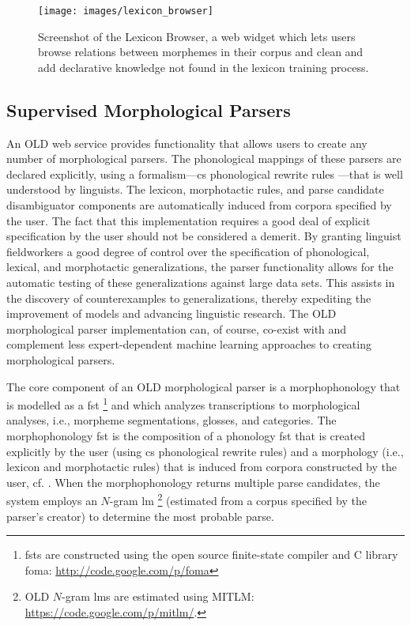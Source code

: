 \documentclass[11pt]{article}
\begin{document}
\begin{figure}
\begin{center}
\texttt{[image: images/lexicon\_browser]}
\caption{Screenshot of the Lexicon Browser, a web widget which lets users browse relations between morphemes in their corpus and clean and add declarative knowledge not found in the lexicon training process.}
\label{lexicon_browser_screenshot}
\end{center}
\end{figure}


\subsection{Supervised Morphological Parsers}

An OLD web service provides functionality that allows users to create any
number of morphological parsers. The phonological mappings of these parsers
are declared explicitly, using a formalism---\gls{cs} phonological rewrite
rules \cite{chomsky68}---that is well understood by linguists. The lexicon,
morphotactic rules, and parse candidate disambiguator components are
automatically induced from corpora specified by the user. The fact that this
implementation requires a good deal of explicit specification by the user
should not be considered a demerit. By granting linguist fieldworkers a good
degree of control over the specification of phonological, lexical, and
morphotactic generalizations, the parser functionality allows for the automatic
testing of these generalizations against large data sets. This assists
in the discovery of counterexamples to generalizations, thereby expediting
the improvement of models and advancing linguistic research. The OLD
morphological parser implementation can, of course, co-exist with and
complement less expert-dependent machine learning approaches to creating
morphological parsers.

The core component of an OLD morphological parser is a morphophonology that is
modelled as a \gls{fst}%
\footnote{\glspl{fst} are constructed using the open source finite-state
compiler and C library foma: \url{http://code.google.com/p/foma}} %
and which analyzes transcriptions to morphological analyses, i.e., morpheme
segmentations, glosses, and categories. The morphophonology \gls{fst} is the
composition of a phonology \gls{fst} that is created explicitly by the user
(using \gls{cs} phonological rewrite rules) and a morphology (i.e., lexicon and
morphotactic rules) that is induced from corpora constructed by the user, cf. 
\cite{beesley2003finite,hulden2012}. When the morphophonology returns multiple
parse candidates, the system employs an $N$-gram \gls{lm}%
\footnote{OLD $N$-gram \glspl{lm} are estimated using MITLM:
\url{https://code.google.com/p/mitlm/}.} %
(estimated from a corpus specified by the parser's creator) to determine the
most probable parse.
\end{document}
